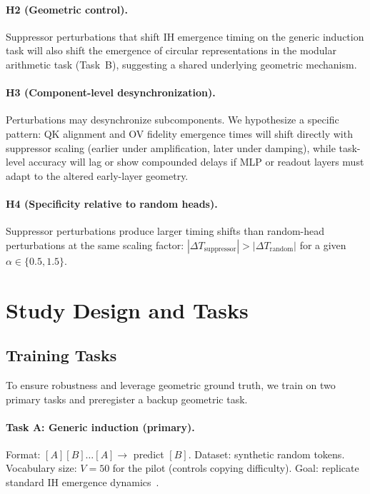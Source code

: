 \documentclass[11pt]{article}
\begin{document}
\paragraph{H2 (Geometric control).}
Suppressor perturbations that shift IH emergence timing on the generic induction task will also shift the emergence of circular representations in the modular arithmetic task (Task~B), suggesting a shared underlying geometric mechanism.

\paragraph{H3 (Component-level desynchronization).}
Perturbations may desynchronize subcomponents. We hypothesize a specific pattern: QK alignment and OV fidelity emergence times will shift directly with suppressor scaling (earlier under amplification, later under damping), while task-level accuracy will lag or show compounded delays if MLP or readout layers must adapt to the altered early-layer geometry.

\paragraph{H4 (Specificity relative to random heads).}
Suppressor perturbations produce larger timing shifts than random-head perturbations at the same scaling factor: $|\Delta T_{\text{suppressor}}| > |\Delta T_{\text{random}}|$ for a given $\alpha \in \{0.5, 1.5\}$.

\section{Study Design and Tasks}

\subsection{Training Tasks}

To ensure robustness and leverage geometric ground truth, we train on two primary tasks and preregister a backup geometric task.

\paragraph{Task A: Generic induction (primary).}
Format: $[A][B] \ldots [A] \rightarrow$ predict $[B]$. Dataset: synthetic random tokens. Vocabulary size: $V = 50$ for the pilot (controls copying difficulty). Goal: replicate standard IH emergence dynamics~\cite{olsson2022induction}.
\end{document}
